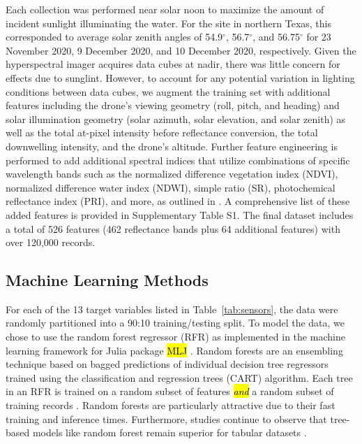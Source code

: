\documentclass[remotesensing,article,accept,pdftex,moreauthors]{Definitions/mdpi}
\begin{document}
Each collection was performed near solar noon to maximize the amount of incident sunlight illuminating the water. For the site in northern Texas, this corresponded to average solar zenith angles of 54.9$^{\circ}$, 56.7$^{\circ}$, and 56.75$^{\circ}$ for 23 November 2020, 9 December 2020, and 10 December 2020, respectively. Given the hyperspectral imager acquires data cubes at nadir, there was little concern for effects due to sunglint. However, to account for any potential variation in lighting conditions between data cubes, we augment the training set with additional features including the drone's viewing geometry (roll, pitch, and heading) and solar illumination geometry (solar azimuth, solar elevation, and solar zenith) as well as the total at-pixel intensity before reflectance conversion, the total downwelling intensity, and the drone's altitude. Further feature engineering is performed to add additional spectral indices that utilize combinations of specific wavelength bands such as the normalized difference vegetation index (NDVI), normalized difference water index (NDWI), simple ratio (SR), photochemical reflectance index (PRI), and more, as outlined in \cite{envi_vegetation_indices, thenkabail2018hyperspectral,kaufman1992atmospherically, SpectralIndexWheat}. A comprehensive list of these added features is provided in Supplementary Table S1. The final dataset includes a total of 526 features (462 reflectance bands plus 64 additional features) with over 120,000 records. 

\subsection{Machine Learning Methods}

For each of the 13 target variables listed in Table~\ref{tab:sensors}, the data were randomly partitioned into a 90:10 training/testing split. To model the data, we chose to use the random forest regressor (RFR) as implemented in the machine learning framework for Julia package  \hl{MLJ} %
 \cite{ben_sadeghi_2022_7359268, MLJ1}.  Random forests are an ensembling technique based on bagged predictions of individual decision tree regressors trained using the classification and regression trees (CART) algorithm. Each tree in an RFR is trained on a random subset of features \textit{\hl{and}} a random subset of training records \cite{decision-trees, random-forest}. Random forests are particularly attractive due to their fast training and inference times. Furthermore, studies continue to observe that tree-based models like random forest remain superior for tabular datasets \cite{grinsztajn2022tree, shwartz2022tabular}.
\end{document}
